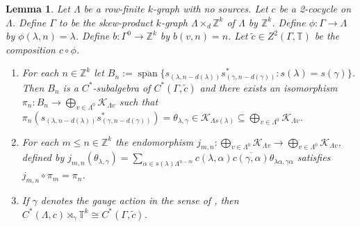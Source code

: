 \documentclass[a4paper, 12pt]{amsart}
\numberwithin{equation}{section}
\newcounter{theorem}
\newtheorem{lemma}[theorem]{Lemma}
\theoremstyle{remark}
\theoremstyle{definition}
\begin{document}
\begin{lemma}\label{lem.3.4.fix}
Let $\Lambda$ be a row-finite $k$-graph with no sources. Let $c$ be a 2-cocycle on
$\Lambda$. Define $\Gamma$ to be the skew-product $k$-graph $\Lambda \times_d {\mathbb{Z}}^k$ of
$\Lambda$ by ${\mathbb{Z}}^k$. Define $\phi\colon \Gamma \to \Lambda$ by $\phi(\lambda, n) =
\lambda$. Define $b \colon \Gamma^0 \to {\mathbb{Z}}^k$ by $b(v, n) = n$. Let $\tilde{c}\in
Z^2(\Gamma,{\mathbb{T}})$ be the composition $c\circ \phi$.
\begin{enumerate}
\item\label{lem.3.4.fix.i} For each $n\in {\mathbb{Z}}^k$ let
    $B_n:={\overline{\operatorname{span}}}\{s_{(\lambda,n-d(\lambda))}s_{(\gamma,n-d(\gamma))}^*:
    s(\lambda)=s(\gamma)\}$. Then $B_n$ is a $C^*$-subalgebra of $C^*(\Gamma,
    \tilde{c})$ and there exists an isomorphism $\pi_n\colon B_n\to \bigoplus_{v\in
    \Lambda^0} {\mathcal{K}}_{\Lambda v}$ such that
    $\pi_n(s_{(\lambda,n-d(\lambda))}s_{(\gamma,n-d(\gamma))}^*)=\theta_{\lambda,\gamma}\in
    {\mathcal{K}}_{\Lambda s(\lambda)}\subseteq \bigoplus_{v\in \Lambda^0} {\mathcal{K}}_{\Lambda v}$.
\item\label{lem.3.4.fix.ii} For each $m\leq n\in {\mathbb{Z}}^k$ the endomorphism $j_{m,n}\colon\bigoplus_{v\in
    \Lambda^0} {\mathcal{K}}_{\Lambda v}\to \bigoplus_{v\in \Lambda^0} {\mathcal{K}}_{\Lambda v}$,
    defined by $j_{m,n}(\theta_{\lambda,\gamma})=\sum_{\alpha\in
    s(\lambda)\Lambda^{n-m}}c(\lambda,\alpha)\overline{c(\gamma,\alpha)}\theta_{\lambda\alpha,\gamma\alpha}$
    satisfies $j_{m,n}\circ \pi_m=\pi_n$.
\item\label{lem.3.4.fix.iii} If $\gamma$ denotes the gauge action in the sense of \cite{MR3335414},
    then $C^*(\Lambda,c)\rtimes_\gamma {\mathbb{T}}^k \cong C^*(\Gamma,\tilde{c})$.
\end{enumerate}
\end{lemma}
\end{document}
